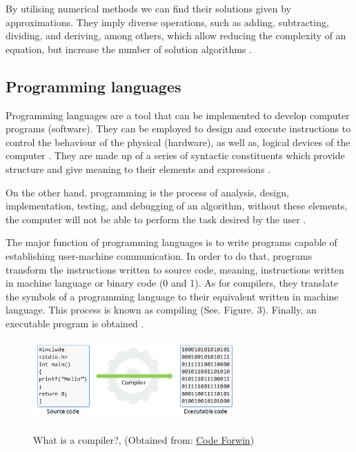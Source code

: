 \documentclass[11pt, letterpaper, english]{article}
\begin{document}
\par{By utilising numerical methods we can find their solutions given by approximations. They imply diverse operations, such as adding, subtracting, dividing, and deriving, among others, which allow reducing the complexity of an equation, but increase the number of solution algorithms  \cite{garfinkel_shevtsov_guo_2017}.}



    \subsection{Programming languages}
    
    \par{Programming languages are a tool that can be implemented to develop computer programs (software). They can be employed to design and execute instructions to control the behaviour of the physical  (hardware), as well as, logical devices of the computer \cite{monterde_2020}. They are made up of a series of syntactic constituents which provide structure and give meaning to their elements and expressions  \cite{garfinkel_shevtsov_guo_2017}.} 
    
     \par{On the other hand, programming is the process of analysis, design, implementation, testing, and debugging of an algorithm, without these elements, the computer will not be able to perform the task desired by the user  \cite{garfinkel_shevtsov_guo_2017}.} 

    \par{The major function of programming languages is to write programs capable of establishing user-machine communication. In order to do that, programs transform the instructions written to source code,  meaning, instructions written in machine language or binary code (0 and 1). As for compilers, they translate the symbols of a programming language to their equivalent written in machine language. This process is known as compiling (See. Figure. 3). Finally, an executable program is obtained  \cite{garfinkel_shevtsov_guo_2017}.}
   
	\begin{figure}
	    \centering
		\caption{What is a compiler?, (Obtained from: \href{https://codeforwin.org/2017/05/compiler-and-its-need.html}{Code Forwin})}
		\includegraphics[width=0.7\textwidth]{compiler}
		\label{Fig-Compiler}
	\end{figure}
\end{document}
